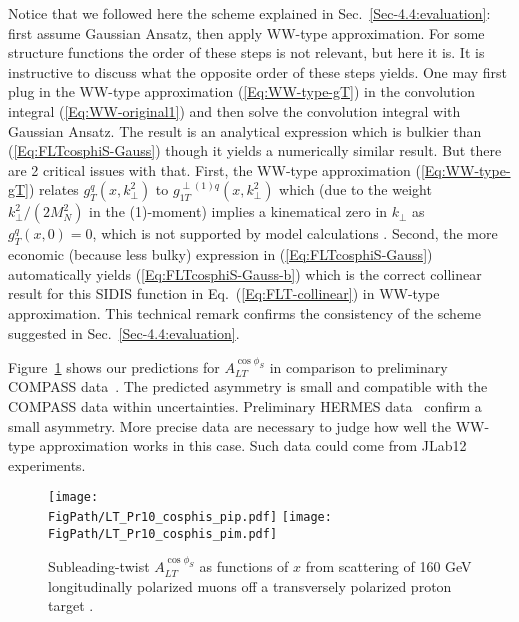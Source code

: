 \documentclass[a4paper,11pt]{article}
\def\kperp{k_\perp}
\newcommand*{\FigPath}{./figs}%
\begin{document}
Notice that we followed here the scheme explained in 
Sec.~\ref{Sec-4.4:evaluation}: first assume Gaussian Ansatz, then apply 
WW-type approximation. For some structure functions the order of 
these steps is not relevant, but here it is. It is instructive to 
discuss what the opposite order of these steps yields. 
One may first plug in the WW-type approximation (\ref{Eq:WW-type-gT}) 
in the convolution integral (\ref{Eq:WW-original1}) and then solve the
convolution integral with Gaussian Ansatz. The result is an
analytical expression which is bulkier than (\ref{Eq:FLTcosphiS-Gauss})  
though it yields a numerically similar result. But there are 2 critical
issues with that. First, the WW-type approximation (\ref{Eq:WW-type-gT}) 
relates $g^{q}_{T}(x,\kperp^2)$ to $g^{\perp(1)q}_{1T}(x,\kperp^2)$ which
(due to the weight $\kperp^2/(2M_N^2)$ in the (1)-moment) implies a kinematical 
zero in $\kperp$ as $g^{q}_{T}(x, 0) = 0$,  which is not supported by model 
calculations \cite{Avakian:2010br}. Second, the more economic (because 
less bulky) expression in (\ref{Eq:FLTcosphiS-Gauss}) automatically 
yields (\ref{Eq:FLTcosphiS-Gauss-b}) which is the correct collinear
result for this SIDIS function in Eq.~(\ref{Eq:FLT-collinear})
in WW-type approximation. This technical remark confirms the
consistency of the scheme suggested in Sec.~\ref{Sec-4.4:evaluation}.

Figure~\ref{altcosphis} shows our predictions
for $A_{LT}^{\cos\phi_S}$ in comparison to preliminary
COMPASS data~\cite{Parsamyan:2013fia}. The predicted
asymmetry is small and compatible with the COMPASS data within
uncertainties. 
Preliminary HERMES data~\cite{Pappalardo:2012zz} confirm a small asymmetry. 
More precise data are necessary to judge how
well the WW-type approximation works in this case. Such data
could come from JLab12 experiments.

\begin{figure}[htb!]
\centering
\texttt{[image: \\FigPath/LT\_Pr10\_cosphis\_pip.pdf]} 
\texttt{[image: \\FigPath/LT\_Pr10\_cosphis\_pim.pdf]} 
\caption{\label{altcosphis} Subleading-twist $A_{LT}^{\cos\phi_S}$ 
	  as functions of $x$ from scattering of 160 GeV
	longitudinally polarized muons off a transversely polarized 
	proton target \cite{Parsamyan:2013fia}.
	}
\end{figure}
\end{document}
